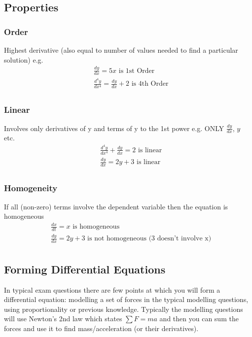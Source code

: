 \documentclass[12pt] {article}
\begin{document}
\subsection*{Properties}
\subsubsection*{Order}
Highest derivative (also equal to number of values needed to find a particular solution) e.g.
\begin{align*}
    &\frac{dy}{dx} = 5x \text{ is 1st Order} \\
    &\frac{d^4y}{dx^4} = \frac{dy}{dx} + 2 \text{ is 4th Order} \\
\end{align*}

\subsubsection*{Linear}
Involves only derivatives of y and terms of y to the 1st power e.g. ONLY $\frac{dy}{dx}$, $y$ etc.
\begin{align*}
    &\frac{d^4y}{dx^4} + \frac{dy}{dx} = 2 \text{ is linear} \\
    &\frac{dy}{dx} = 2y + 3 \text{ is linear} \\
\end{align*}

\subsubsection*{Homogeneity} 
If all (non-zero) terms involve the dependent variable then the equation is homogeneous
\begin{align*}
    &\frac{dx}{dt} = x \text{ is homogeneous} \\
    &\frac{dy}{dx} = 2y + 3 \text{ is not homogeneous (3 doesn't involve x)} \\
\end{align*}

\subsection*{Forming Differential Equations}
In typical exam questions there are few points at which you will form a differential equation: modelling a set 
of forces in the typical modelling questions, using proportionality or previous knowledge. Typically the modelling 
questions will use Newton's 2nd law which states $\sum F = ma$ and then you can sum the forces and use it to find
mass/acceleration (or their derivatives). 
\end{document}
